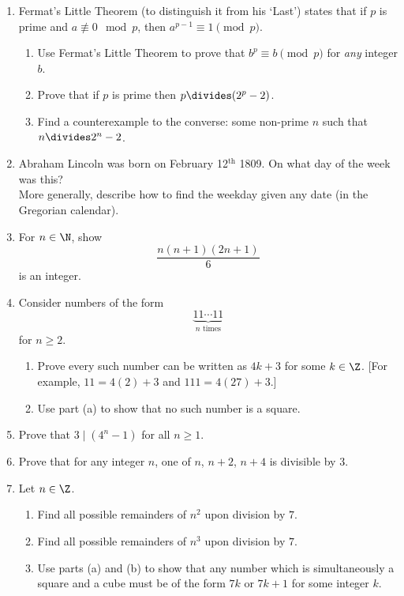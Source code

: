 \begin{enumerate}
	\item Fermat's Little Theorem (to distinguish it from his `Last') states that if $p$ is prime and $a\not\equiv 0\mod p$, then $a^{p-1}\equiv 1\pmod p$.
	\begin{enumerate}
	  \item Use Fermat's Little Theorem to prove that $b^p\equiv b\pmod p$ for \emph{any} integer $b$.
	  \item Prove that if $p$ is prime then $p\divides (2^p-2)$.
	  \item Find a counterexample to the converse: some non-prime $n$ such that $n\divides 2^n-2$.
	\end{enumerate}
	
	\item Abraham Lincoln was born on February 12$^\text{th}$ 1809. On what day of the week was this?\\
	More generally, describe how to find the weekday given any date (in the Gregorian calendar).
	
	    \item For $n \in \N$, show
    \[
        \frac{n(n+1)(2n+1)}{6}
    \]
    is an integer.
    
    \item Consider numbers of the form
    \[
    \underbrace{11\cdots 11}_{n \text{ times}}
    \]
    for $n \geq 2$.
    \begin{enumerate}
        \item Prove every such number can be written as $4k + 3$ for some $k \in \Z$. [For example, $11 = 4(2)+3$ and $111 = 4(27) + 3$.]
        \item Use part (a) to show that no such number is a square.
    \end{enumerate}
    
    \item Prove that $3 \mid (4^n - 1)$ for all $n \geq 1$.
    
    \item Prove that for any integer $n$, one of $n$, $n + 2$, $n + 4$ is divisible by $3$.
    
    \item Let $n \in \Z$.
    \begin{enumerate}
        \item Find all possible remainders of $n^2$ upon division by $7$.
        \item Find all possible remainders of $n^3$ upon division by $7$.
        \item Use parts (a) and (b) to show that any number which is simultaneously a square and a cube must be of the form $7k$ or $7k + 1$ for some integer $k$.
    \end{enumerate}
    

\end{enumerate}
